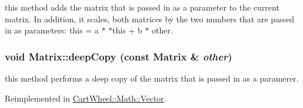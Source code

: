 this method adds the matrix that is passed in as a parameter to the current matrix. In addition, it scales, both matrices by the two numbers that are passed in as parameters: this = a $\ast$ $\ast$this + b $\ast$ other. \hypertarget{classCartWheel_1_1Math_1_1Matrix_ae2507575dc309db73a9728f7434b3ac3}{
\subsubsection[{deepCopy}]{\setlength{\rightskip}{0pt plus 5cm}void Matrix::deepCopy (const {\bf Matrix} \& {\em other})}}
\label{classCartWheel_1_1Math_1_1Matrix_ae2507575dc309db73a9728f7434b3ac3}
this method performs a deep copy of the matrix that is passed in as a paramerer. 

Reimplemented in \hyperlink{classCartWheel_1_1Math_1_1Vector_aecfcd019a564ab7b9f71e2585de515f6}{CartWheel::Math::Vector}.


